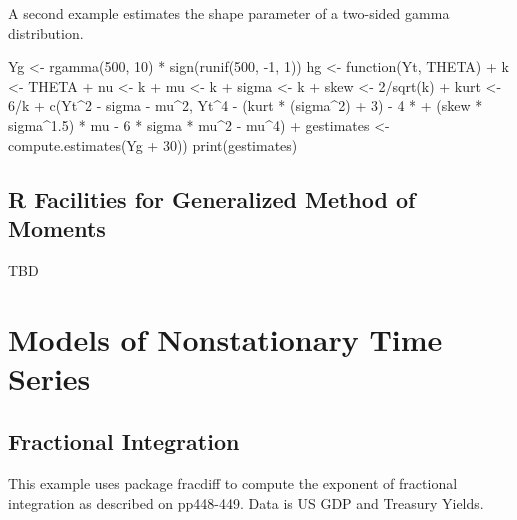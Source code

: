 \documentclass[a4paper]{article}
\begin{document}
A second example estimates the shape parameter of a two-sided gamma distribution.
\begin{Schunk}
\begin{Sinput}
 Yg <- rgamma(500, 10) * sign(runif(500, -1, 1))
 hg <- function(Yt, THETA) {
+     k <- THETA
+     nu <- k
+     mu <- k
+     sigma <- k
+     skew <- 2/sqrt(k)
+     kurt <- 6/k
+     c(Yt^2 - sigma - mu^2, Yt^4 - (kurt * (sigma^2) + 3) - 4 * 
+         (skew * sigma^1.5) * mu - 6 * sigma * mu^2 - mu^4)
+ }
 gestimates <- compute.estimates(Yg %
+     30))
 print(gestimates)
\end{Sinput}
\end{Schunk}
\subsection{R Facilities for Generalized Method of Moments}
TBD
\section{Models of Nonstationary Time Series}
\subsection{Fractional Integration}
This example uses package fracdiff to compute the exponent of fractional integration as described on pp448-449.
Data is US GDP and Treasury Yields.
\begin{Schunk}
\end{Schunk}
\end{document}
